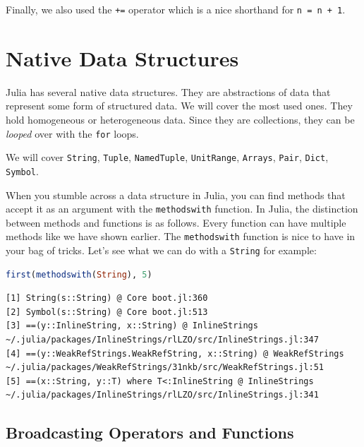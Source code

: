 \documentclass[
  notoc %
]{tufte-book}
\newcommand{\passthrough}[1]{#1}
\begin{document}
Finally, we also used the \passthrough{\lstinline!+=!} operator which is
a nice shorthand for \passthrough{\lstinline!n = n + 1!}.

\hypertarget{sec:data_structures}{%
\section{Native Data Structures}\label{sec:data_structures}}

Julia has several native data structures. They are abstractions of data
that represent some form of structured data. We will cover the most used
ones. They hold homogeneous or heterogeneous data. Since they are
collections, they can be \emph{looped} over with the
\passthrough{\lstinline!for!} loops.

We will cover \passthrough{\lstinline!String!},
\passthrough{\lstinline!Tuple!}, \passthrough{\lstinline!NamedTuple!},
\passthrough{\lstinline!UnitRange!}, \passthrough{\lstinline!Arrays!},
\passthrough{\lstinline!Pair!}, \passthrough{\lstinline!Dict!},
\passthrough{\lstinline!Symbol!}.

When you stumble across a data structure in Julia, you can find methods
that accept it as an argument with the
\passthrough{\lstinline!methodswith!} function. In Julia, the
distinction between methods and functions is as follows. Every function
can have multiple methods like we have shown earlier. The
\passthrough{\lstinline!methodswith!} function is nice to have in your
bag of tricks. Let's see what we can do with a
\passthrough{\lstinline!String!} for example:

\begin{lstlisting}[language=Julia]
first(methodswith(String), 5)
\end{lstlisting}

\begin{lstlisting}[language=Output]
[1] String(s::String) @ Core boot.jl:360
[2] Symbol(s::String) @ Core boot.jl:513
[3] ==(y::InlineString, x::String) @ InlineStrings ~/.julia/packages/InlineStrings/rlLZO/src/InlineStrings.jl:347
[4] ==(y::WeakRefStrings.WeakRefString, x::String) @ WeakRefStrings ~/.julia/packages/WeakRefStrings/31nkb/src/WeakRefStrings.jl:51
[5] ==(x::String, y::T) where T<:InlineString @ InlineStrings ~/.julia/packages/InlineStrings/rlLZO/src/InlineStrings.jl:341
\end{lstlisting}

\hypertarget{sec:broadcasting}{%
\subsection{Broadcasting Operators and
Functions}\label{sec:broadcasting}}
\end{document}
